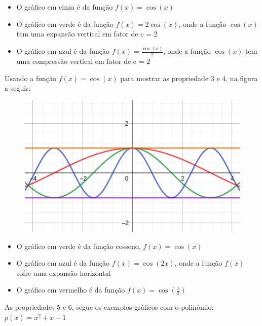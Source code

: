 \begin{multicols*}{2}
            \begin{itemize}
                \item O gráfico em cinza é da função $f(x) = \cos(x)$
                \item O gráfico em verde é da função $f(x) = 2 \cos(x)$, onde a função $\cos(x)$ tem uma 						expansão vertical em fator de c = 2
                \item O gráfico em azul é da função $f(x) = \frac{\cos(x)}{2}$, onde a função $\cos(x)$ tem 					uma compressão vertical em fator de c = 2
            \end{itemize}
            Usando a função $f(x) = \cos(x)$ para mostrar as propriedade 3 e 4, na figura a seguir:
            \begin{figure}[H]
                    \includegraphics[scale=0.4]{assets/rafael/img9.png}
            \end{figure}
            \begin{itemize}
            \item O gráfico em verde é da função cosseno, $f(x) = \cos(x)$
            \item O gráfico em azul é da função $f(x) = \cos(2x)$, onde a função $f(x)$ sofre uma expansão 						horizontal
            \item O gráfico em vermelho é da função $f(x) = \cos \left( \frac{x}{2} \right) $
            \end{itemize}
            As propriedades 5 e 6, segue os exemplos gráficos com o polinômio: $p(x) = x^2 + x +1$
            \begin{figure}[H]

\end{figure}
\end{multicols*}
